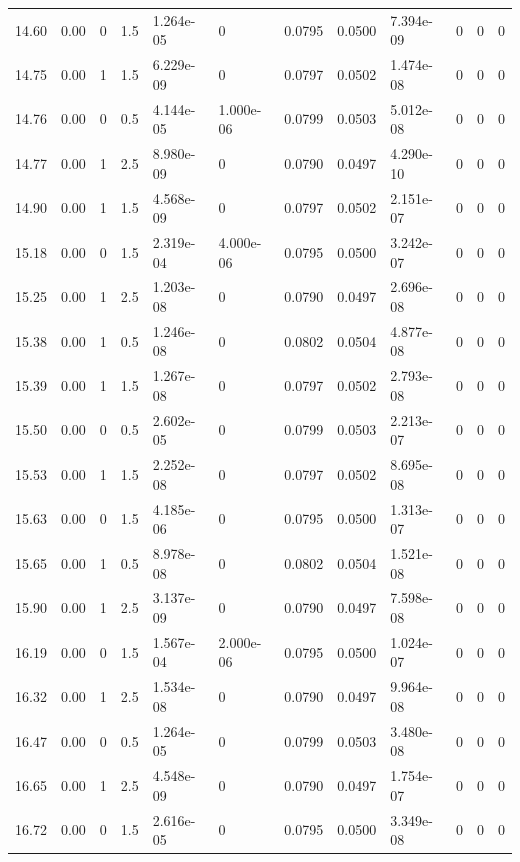 \documentclass[preview]{standalone}
\begin{document}
{{{{\begin{tabular}{L{1.2cm}C{1.2cm} C{0.3cm}C{0.5cm} C{1.4cm}C{1.4cm} C{1.4cm}C{1.4cm} C{1.6cm}C{1.6cm} C{1.6cm}C{1.6cm}}
  14.60  &  0.00  & 0     & 1.5 &  1.264e-05  & 0  &  0.0795&   0.0500& 7.394e-09 & 0   &  0 & 0  \\ 
  14.75  &  0.00  & 1     & 1.5 &  6.229e-09  & 0  &  0.0797&   0.0502& 1.474e-08 & 0   &  0 & 0  \\ 
  14.76  &  0.00  & 0     & 0.5 &  4.144e-05  & 1.000e-06  &  0.0799&   0.0503& 5.012e-08 & 0   &  0 & 0  \\ 
  14.77  &  0.00  & 1     & 2.5 &  8.980e-09  & 0  &  0.0790&   0.0497& 4.290e-10 & 0   &  0 & 0  \\ 
  14.90  &  0.00  & 1     & 1.5 &  4.568e-09  & 0  &  0.0797&   0.0502& 2.151e-07 & 0   &  0 & 0  \\ 
  15.18  &  0.00  & 0     & 1.5 &  2.319e-04  & 4.000e-06  &  0.0795&   0.0500& 3.242e-07 & 0   &  0 & 0  \\ 
  15.25  &  0.00  & 1     & 2.5 &  1.203e-08  & 0  &  0.0790&   0.0497& 2.696e-08 & 0   &  0 & 0  \\ 
  15.38  &  0.00  & 1     & 0.5 &  1.246e-08  & 0  &  0.0802&   0.0504& 4.877e-08 & 0   &  0 & 0  \\ 
  15.39  &  0.00  & 1     & 1.5 &  1.267e-08  & 0  &  0.0797&   0.0502& 2.793e-08 & 0   &  0 & 0  \\ 
  15.50  &  0.00  & 0     & 0.5 &  2.602e-05  & 0  &  0.0799&   0.0503& 2.213e-07 & 0   &  0 & 0  \\ 
  15.53  &  0.00  & 1     & 1.5 &  2.252e-08  & 0  &  0.0797&   0.0502& 8.695e-08 & 0   &  0 & 0  \\ 
  15.63  &  0.00  & 0     & 1.5 &  4.185e-06  & 0  &  0.0795&   0.0500& 1.313e-07 & 0   &  0 & 0  \\ 
  15.65  &  0.00  & 1     & 0.5 &  8.978e-08  & 0  &  0.0802&   0.0504& 1.521e-08 & 0   &  0 & 0  \\ 
  15.90  &  0.00  & 1     & 2.5 &  3.137e-09  & 0  &  0.0790&   0.0497& 7.598e-08 & 0   &  0 & 0  \\ 
  16.19  &  0.00  & 0     & 1.5 &  1.567e-04  & 2.000e-06  &  0.0795&   0.0500& 1.024e-07 & 0   &  0 & 0  \\ 
  16.32  &  0.00  & 1     & 2.5 &  1.534e-08  & 0  &  0.0790&   0.0497& 9.964e-08 & 0   &  0 & 0  \\ 
  16.47  &  0.00  & 0     & 0.5 &  1.264e-05  & 0  &  0.0799&   0.0503& 3.480e-08 & 0   &  0 & 0  \\ 
  16.65  &  0.00  & 1     & 2.5 &  4.548e-09  & 0  &  0.0790&   0.0497& 1.754e-07 & 0   &  0 & 0  \\ 
  16.72  &  0.00  & 0     & 1.5 &  2.616e-05  & 0  &  0.0795&   0.0500& 3.349e-08 & 0   &  0 & 0  \\ 

\end{tabular}}}}}
\end{document}
